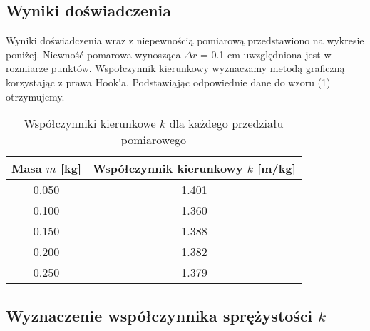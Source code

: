 \documentclass{article} %
\begin{document}
\subsection{Wyniki doświadczenia}
Wyniki doświadczenia wraz z niepewnością pomiarową przedstawiono na wykresie poniżej. Niewność pomarowa wynosząca $\Delta r$ = 0.1 cm uwzględniona jest w rozmiarze punktów. Wspołczynnik kierunkowy wyznaczamy metodą graficzną korzystając z prawa Hook'a. Podstawiąjąc odpowiednie dane do wzoru (1) otrzymujemy.
{
\begin{center}



\begin{table}[h!]
\centering

\label{tab:coefficients}

\begin{tabular}{|c|c|}
\hline
\textbf{Masa \( m \) [kg]} & \textbf{Współczynnik kierunkowy \( k \) [m/kg]} \\ 
\hline
0.050 & 1.401 \\ 
0.100 & 1.360\\ 
0.150 & 1.388 \\ 
0.200 & 1.382 \\
0.250 & 1.379 \\
\hline
\end{tabular}
\caption{Współczynniki kierunkowe \( k \) dla każdego przedziału pomiarowego}
\end{table}
\end{center}
}
\subsection{Wyznaczenie współczynnika sprężystości $k$}
\end{document}

